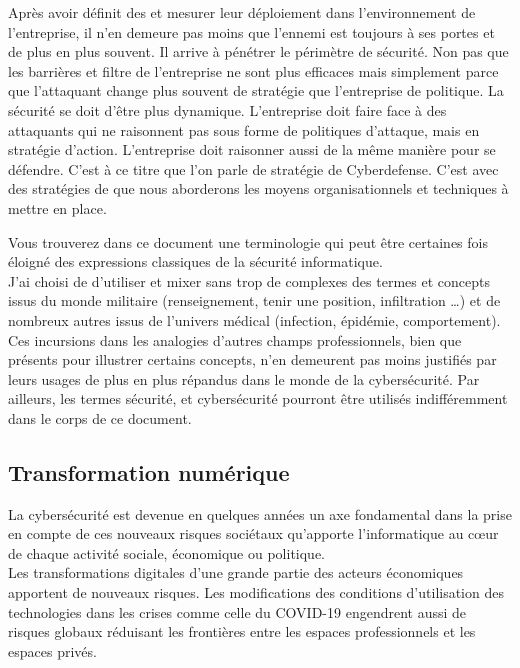 Après avoir définit des  et mesurer leur déploiement dans l’environnement de l’entreprise, il n’en demeure pas moins que l’ennemi est toujours à ses portes et de plus en plus souvent. Il arrive à pénétrer le périmètre de sécurité.
Non pas que les barrières et filtre de l'entreprise ne sont plus efficaces mais simplement parce que l'attaquant change plus souvent de stratégie que l'entreprise de politique. La sécurité se doit d'être plus dynamique.
L’entreprise doit faire face à des attaquants qui ne raisonnent pas sous forme de politiques d’attaque, mais en stratégie d'action. L’entreprise doit raisonner aussi de la même manière pour se défendre. C'est à ce titre que l'on parle de stratégie de Cyberdefense.
C'est avec des stratégies de  que nous aborderons les moyens organisationnels et techniques à mettre en place.

Vous trouverez  dans ce document une terminologie qui peut être certaines fois éloigné des expressions classiques de la sécurité informatique. \\
J'ai choisi de d'utiliser et mixer sans trop de complexes des termes et concepts issus du monde militaire (renseignement, tenir une position, infiltration …) et de nombreux autres issus de l'univers médical (infection, épidémie, comportement).\\ Ces incursions dans les analogies d'autres champs professionnels, bien que présents pour illustrer certains concepts, n'en demeurent pas moins justifiés par leurs usages de plus en plus répandus dans le monde de la cybersécurité. Par ailleurs, les termes sécurité, et cybersécurité pourront être utilisés indifféremment dans le corps de ce document.

\subsection {Transformation numérique}


La cybersécurité est devenue en quelques années un axe fondamental dans la prise en compte de ces nouveaux risques sociétaux qu'apporte l'informatique au cœur de chaque activité sociale, économique ou politique. \\

Les  transformations digitales d'une grande partie des acteurs économiques apportent de nouveaux risques. Les modifications des conditions d'utilisation des technologies dans les crises comme celle du COVID-19 engendrent aussi de risques globaux réduisant les frontières entre les espaces professionnels et les espaces privés.

